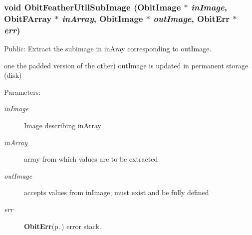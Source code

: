 \subsubsection{\setlength{\rightskip}{0pt plus 5cm}void Obit\-Feather\-Util\-Sub\-Image ({\bf Obit\-Image} $\ast$ {\em in\-Image}, {\bf Obit\-FArray} $\ast$ {\em in\-Array}, {\bf Obit\-Image} $\ast$ {\em out\-Image}, {\bf Obit\-Err} $\ast$ {\em err})}\label{ObitFeatherUtil_8c_a11}


Public: Extract the subimage in in\-Aray corresponding to out\-Image. 

one the padded version of the other) out\-Image is updated in permanent storage (disk) \begin{Desc}
\item[Parameters:]
\begin{description}
\item[{\em in\-Image}]Image describing in\-Array \item[{\em in\-Array}]array from which values are to be extracted \item[{\em out\-Image}]accepts values from in\-Image, must exist and be fully defined \item[{\em err}]{\bf Obit\-Err}{\rm (p.\,\pageref{structObitErr})} error stack. \end{description}
\end{Desc}
